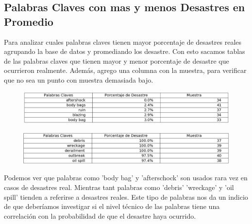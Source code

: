 \documentclass[titlepage,a4paper]{article}
\begin{document}
\subsection{\Large Palabras Claves con mas y menos Desastres en Promedio }
{\Large
Para analizar cuales palabras claves tienen mayor porcentaje de desastres reales agrupando la base de datos y promediando los desastre. Con esto sacamos tablas de las palabras claves que tienen mayor y menor porcentaje de desastre que ocurrieron realmente. Además, agrego una columna con la muestra, para verificar que no sea un punto con muestra demasiada bajo.
\begin{figure}[H]
 \centering
 \includegraphics[width=1\textwidth, height=1\textheight, keepaspectratio]{graficos/tabla_palabras_claves_veracidad_min.png}
\end{figure}
\begin{figure}[H]
 \centering
 \includegraphics[width=1\textwidth, height=1\textheight, keepaspectratio]{graficos/tabla_palabras_claves_veracidad_max.png}
\end{figure}
Podemos ver que palabras como 'body bag' y 'afterschock' son usados rara vez en casos de desastres real. Mientras tant palabras como 'debris' 'wreckage' y 'oil spill' tienden a referirse a desastres reales. Este tipo de palabras nos da un indicio de que deberíamos investigar si el nivel técnico de las palabras tiene una  correlación con la probabilidad de que el desastre haya ocurrido.
\par}
\end{document}
